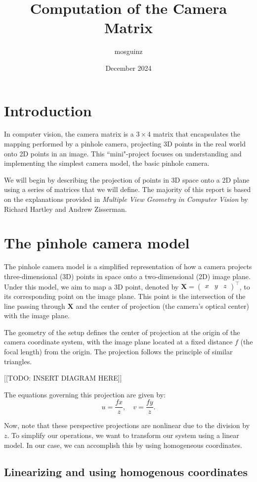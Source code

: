 \documentclass[12pt]{article}
\title{Computation of the Camera Matrix}
\author{mosguinz}
\date{December 2024}
\begin{document}
\section{Introduction}

In computer vision, the camera matrix is a $3 \times 4$ matrix that encapsulates the mapping performed by a pinhole camera, projecting 3D points in the real world onto 2D points in an image. This ``mini"-project focuses on understanding and implementing the simplest camera model, the basic pinhole camera.

We will begin by describing the projection of points in 3D space onto a 2D plane using a series of matrices that we will define. The majority of this report is based on the explanations provided in \textit{Multiple View Geometry in Computer Vision} by Richard Hartley and Andrew Zisserman.

\section{The pinhole camera model}

The pinhole camera model is a simplified representation of how a camera projects three-dimensional (3D) points in space onto a two-dimensional (2D) image plane. Under this model, we aim to map a 3D point, denoted by 
$\mathbf{X} = \begin{pmatrix} x & y & z \end{pmatrix}^\top$, 
to its corresponding point on the image plane. This point is the intersection of the line passing through $\mathbf{X}$ and the center of projection (the camera's optical center) with the image plane.

The geometry of the setup defines the center of projection at the origin of the camera coordinate system, with the image plane located at a fixed distance $f$ (the focal length) from the origin. The projection follows the principle of similar triangles.

[[TODO: INSERT DIAGRAM HERE]]

The equations governing this projection are given by:
$$
u = \frac{f x}{z}, \quad v = \frac{f y}{z}.
$$

Now, note that these perspective projections are nonlinear due to the division by $z$. To simplify our operations, we want to transform our system using a linear model. In our case, we can accomplish this by using homogeneous coordinates.

\subsection{Linearizing and using homogenous coordinates}
\end{document}
